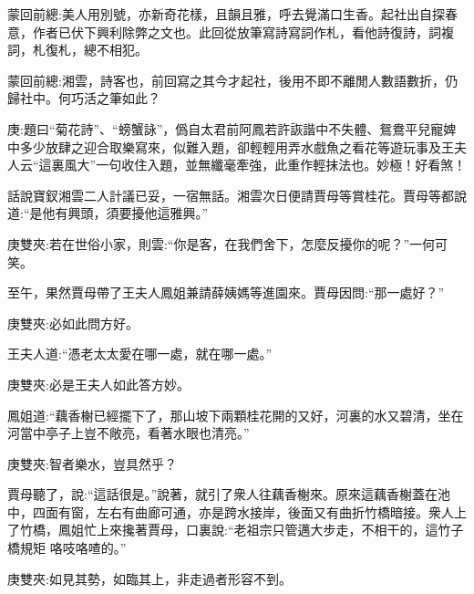 
\begin{parag}
    \begin{note}蒙回前總:美人用別號，亦新奇花樣，且韻且雅，呼去覺滿口生香。起社出自探春意，作者已伏下興利除弊之文也。此回從放筆寫詩寫詞作札，看他詩復詩，詞複詞，札復札，總不相犯。\end{note}
\end{parag}


\begin{parag}
    \begin{note}蒙回前總:湘雲，詩客也，前回寫之其今才起社，後用不即不離閒人數語數折，仍歸社中。何巧活之筆如此？\end{note}
\end{parag}


\begin{parag}
    \begin{note}庚:題曰“菊花詩”、“螃蟹詠”，僞自太君前阿鳳若許詼諧中不失體、鴛鴦平兒寵婢中多少放肆之迎合取樂寫來，似難入題，卻輕輕用弄水戲魚之看花等遊玩事及王夫人云“這裏風大”一句收住入題，並無纖毫牽強，此重作輕抹法也。妙極！好看煞！\end{note}
\end{parag}


\begin{parag}
    話說寶釵湘雲二人計議已妥，一宿無話。湘雲次日便請賈母等賞桂花。賈母等都說道:“是他有興頭，須要擾他這雅興。”\begin{note}庚雙夾:若在世俗小家，則雲:“你是客，在我們舍下，怎麼反擾你的呢？”一何可笑。\end{note}至午，果然賈母帶了王夫人鳳姐兼請薛姨媽等進園來。賈母因問:“那一處好？”\begin{note}庚雙夾:必如此問方好。\end{note}王夫人道:“憑老太太愛在哪一處，就在哪一處。”\begin{note}庚雙夾:必是王夫人如此答方妙。\end{note}鳳姐道:“藕香榭已經擺下了，那山坡下兩顆桂花開的又好，河裏的水又碧清，坐在河當中亭子上豈不敞亮，看著水眼也清亮。”\begin{note}庚雙夾:智者樂水，豈具然乎？\end{note}賈母聽了，說:“這話很是。”說著，就引了衆人往藕香榭來。原來這藕香榭蓋在池中，四面有窗，左右有曲廊可通，亦是跨水接岸，後面又有曲折竹橋暗接。衆人上了竹橋，鳳姐忙上來攙著賈母，口裏說:“老祖宗只管邁大步走，不相干的，這竹子橋規矩 咯吱咯喳的。”\begin{note}庚雙夾:如見其勢，如臨其上，非走過者形容不到。\end{note}
\end{parag}


